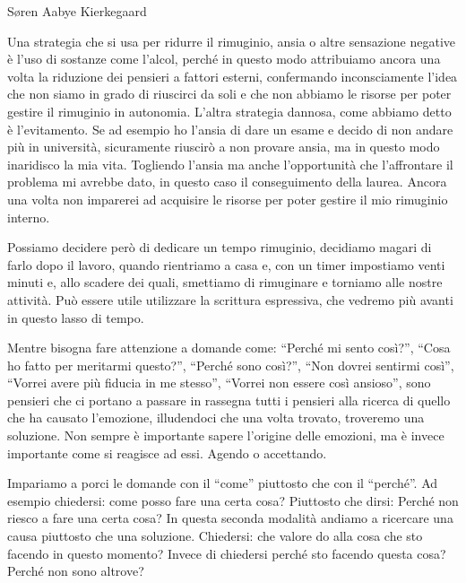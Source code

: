 \documentclass[12pt]{book} %
\begin{document}
Søren Aabye Kierkegaard

Una strategia che si usa per ridurre il rimuginio, ansia o altre sensazione negative è l'uso di sostanze come l'alcol,
perché in questo modo attribuiamo ancora una volta la riduzione dei pensieri a fattori esterni, confermando
inconsciamente l'idea che non siamo in grado di riuscirci da soli e che non abbiamo le risorse per
poter gestire il rimuginio in autonomia. L'altra strategia dannosa, come abbiamo detto è
l'evitamento. Se ad esempio ho l'ansia di dare un esame e decido di non
andare più in università, sicuramente riuscirò a non provare ansia, ma in questo modo inaridisco la mia vita. Togliendo
l'ansia ma anche l'opportunità che l'affrontare il problema mi avrebbe dato, in questo caso il conseguimento della
laurea. Ancora una volta non imparerei ad acquisire le risorse per poter gestire il mio rimuginio interno. 

Possiamo decidere però di dedicare un tempo rimuginio, decidiamo magari di farlo dopo il lavoro, quando rientriamo a
casa e, con un timer impostiamo venti minuti e, allo scadere dei quali, smettiamo di rimuginare e torniamo alle nostre
attività. Può essere utile utilizzare la scrittura espressiva, che vedremo più avanti in questo lasso di tempo.

Mentre bisogna fare attenzione a domande come: “Perché mi sento così?”, “Cosa ho fatto per meritarmi questo?”, “Perché
sono così?”, “Non dovrei sentirmi così”, “Vorrei avere più fiducia in me stesso”, “Vorrei non essere così ansioso”,
sono pensieri che ci portano a passare in rassegna tutti i pensieri alla ricerca di quello che ha causato
l'emozione, illudendoci che una volta trovato, troveremo una soluzione. Non sempre è importante
sapere l'origine delle emozioni, ma è invece importante come si reagisce ad essi. Agendo o
accettando.

Impariamo a porci le domande con il “come” piuttosto che con il “perché”. Ad esempio chiedersi: come posso fare una
certa cosa? Piuttosto che dirsi: Perché non riesco a fare una certa cosa? In questa seconda modalità andiamo a
ricercare una causa piuttosto che una soluzione. Chiedersi: che valore do alla cosa che sto facendo in questo momento?
Invece di chiedersi perché sto facendo questa cosa? Perché non sono altrove? 
\end{document}
